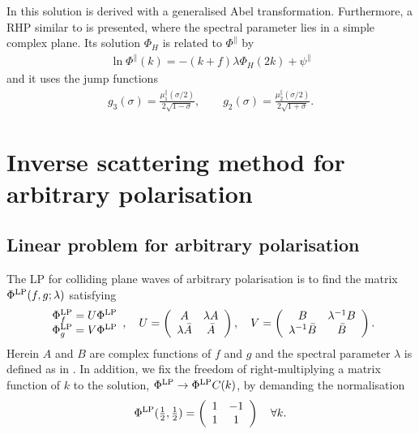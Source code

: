 \documentclass[12pt]{iopart}
\begin{document}
In \cite{Hauser_ErnstI1989} this solution is derived with a generalised Abel transformation. Furthermore, a RHP similar to  is presented, where the spectral parameter lies in a simple complex plane. Its solution $\Phi_H$ is related to $\Phi^\|$ by
\begin{eqnarray} \label{Beziehung_2}
\ln\Phi^\|(k)=-(k+f)\lambda\Phi_H(2k)+\psi^\|
\end{eqnarray}
and it uses the jump functions
\begin{eqnarray} 
g_3(\sigma)=\frac{\mu^\|_1(\sigma/2)}{2\sqrt{1-\sigma}},\quad\quad g_2(\sigma)=\frac{\mu^\|_2(\sigma/2)}{2\sqrt{1+\sigma}}.
\end{eqnarray}


\section{Inverse scattering method for arbitrary polarisation}


\subsection{Linear problem for arbitrary polarisation}

The LP for colliding plane waves of arbitrary polarisation is to find the matrix $\Phi^{\rm LP}(f,g;\lambda)$ satisfying
\begin{equation} \label{algLP}
\begin{array}{c}
 \Phi^{\rm LP}_f =U\Phi^{\rm LP}\\ 
 \Phi^{\rm LP}_g =V\Phi^{\rm LP}
\end{array},\quad
U=
\left(\begin{array}{cc}
A & \lambda  A \\ 
\lambda \bar{A}  & \bar{A}             \\ 
\end{array}\right),\quad
V=
\left(\begin{array}{cc}
B & \lambda^{-1} B  \\ 
\lambda^{-1} \bar{B}  & \bar{B}             \\ 
\end{array}\right).
\end{equation}
Herein $A$ and $B$ are complex functions of $f$ and $g$ and the spectral parameter $\lambda$ is defined as in . In addition, we fix the freedom of right-multiplying a matrix function of $k$ to the solution, $\Phi^{\rm LP}\rightarrow\Phi^{\rm LP} C(k)$, by demanding the normalisation
\begin{eqnarray} \label{LPNorm}
\Phi^{\rm LP}(\mbox{$\frac12$},\mbox{$\frac12$})=\left(\begin{array}{cc} 1 & -1 \\ 1 & 1 \end{array}\right) \quad \forall k.
\end{eqnarray}
\end{document}
